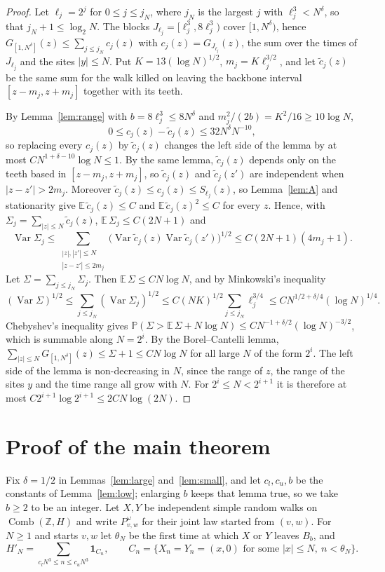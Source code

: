 \documentclass[11pt]{amsart}
\theoremstyle{remark}
\numberwithin{equation}{section}
\newcommand{\Comb}{\operatorname{Comb}}
\newcommand{\PP}{\mathbb{P}}
\newcommand{\EE}{\mathbb{E}}
\newcommand{\Z}{\mathbb{Z}}
\begin{document}
\begin{proof}
Let $\ell_j=2^j$ for $0\le j\le j_N$, where $j_N$ is the largest $j$ with $\ell_j^3<N^\delta$, so that $j_N+1\le\log_2N$. The blocks $J_{\ell_j}=[\ell_j^3,8\ell_j^3)$ cover $[1,N^\delta)$, hence $G_{[1,N^\delta]}(z)\le\sum_{j\le j_N}c_j(z)$ with $c_j(z)=G_{J_{\ell_j}}(z)$, the sum over the times of $J_{\ell_j}$ and the sites $|y|\le N$. Put $K=13(\log N)^{1/2}$, $m_j=K\ell_j^{3/2}$, and let $\tilde c_j(z)$ be the same sum for the walk killed on leaving the backbone interval $[z-m_j,z+m_j]$ together with its teeth.

By Lemma~\ref{lem:range} with $b=8\ell_j^3\le8N^\delta$ and $m_j^2/(2b)=K^2/16\ge10\log N$,
\[
0\le c_j(z)-\tilde c_j(z)\le32N^{\delta}N^{-10},
\]
so replacing every $c_j(z)$ by $\tilde c_j(z)$ changes the left side of the lemma by at most $C N^{1+\delta-10}\log N\le1$. By the same lemma, $\tilde c_j(z)$ depends only on the teeth based in $[z-m_j,z+m_j]$, so $\tilde c_j(z)$ and $\tilde c_j(z')$ are independent when $|z-z'|>2m_j$. Moreover $\tilde c_j(z)\le c_j(z)\le S_{\ell_j}(z)$, so Lemma~\ref{lem:A} and stationarity give $\EE\,\tilde c_j(z)\le C$ and $\EE\,\tilde c_j(z)^2\le C$ for every $z$. Hence, with $\Sigma_j=\sum_{|z|\le N}\tilde c_j(z)$,
$\EE\,\Sigma_j\le C(2N+1)$ and
\[
\operatorname{Var}\Sigma_j\le\sum_{\substack{|z|,|z'|\le N\\ |z-z'|\le2m_j}}\bigl(\operatorname{Var}\tilde c_j(z)\operatorname{Var}\tilde c_j(z')\bigr)^{1/2}\le C(2N+1)(4m_j+1).
\]
Let $\Sigma=\sum_{j\le j_N}\Sigma_j$. Then $\EE\,\Sigma\le CN\log N$, and by Minkowski's inequality
\[
(\operatorname{Var}\Sigma)^{1/2}\le\sum_{j\le j_N}(\operatorname{Var}\Sigma_j)^{1/2}\le C(NK)^{1/2}\sum_{j\le j_N}\ell_j^{3/4}\le CN^{1/2+\delta/4}(\log N)^{1/4}.
\]
Chebyshev's inequality gives $\PP(\Sigma>\EE\,\Sigma+N\log N)\le CN^{-1+\delta/2}(\log N)^{-3/2}$, which is summable along $N=2^i$. By the Borel--Cantelli lemma, $\sum_{|z|\le N}G_{[1,N^\delta]}(z)\le\Sigma+1\le CN\log N$ for all large $N$ of the form $2^i$. The left side of the lemma is non-decreasing in $N$, since the range of $z$, the range of the sites $y$ and the time range all grow with $N$. For $2^i\le N<2^{i+1}$ it is therefore at most $C2^{i+1}\log2^{i+1}\le 2CN\log(2N)$.
\end{proof}

\section{Proof of the main theorem}\label{sec:proof}
Fix $\delta=1/2$ in Lemmas~\ref{lem:large} and~\ref{lem:small}, and let $c_l,c_u,b$ be the constants of Lemma~\ref{lem:low}; enlarging $b$ keeps that lemma true, so we take $b\ge2$ to be an integer. Let $X,Y$ be independent simple random walks on $\Comb(\Z,H)$ and write $P^\omega_{v,w}$ for their joint law started from $(v,w)$. For $N\ge1$ and starts $v,w$ let $\theta_N$ be the first time at which $X$ or $Y$ leaves $B_b$, and
\[
H'_N=\sum_{c_lN^3\le n\le c_uN^3}\mathbf 1_{C_n},\qquad C_n=\bigl\{X_n=Y_n=(x,0)\text{ for some }|x|\le N,\ n<\theta_N\bigr\}.
\]
\end{document}
